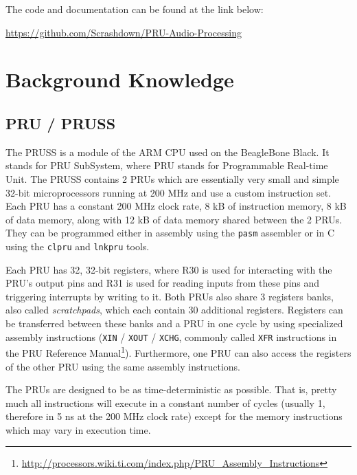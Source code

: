 \documentclass[]{report}
\begin{document}
The code and documentation can be found at the link below:
\begin{center}
	\url{https://github.com/Scrashdown/PRU-Audio-Processing}
\end{center}

	\chapter{Background Knowledge}
	\label{theory}

\hypertarget{pru-pruss}{%
\section{PRU / PRUSS}\label{pru-pruss}}

The PRUSS is a module of the ARM CPU used on the BeagleBone Black. It stands for PRU SubSystem, where PRU stands for Programmable Real-time Unit. The PRUSS contains 2 PRUs which are essentially very small and simple 32-bit microprocessors running at 200 MHz and use a custom instruction set. Each PRU has a constant 200 MHz clock rate, 8 kB of instruction memory, 8 kB of data memory, along with 12 kB of data memory shared between the 2 PRUs. They can be programmed either in assembly using the \texttt{pasm} assembler or in C using the \texttt{clpru} and \texttt{lnkpru} tools.

Each PRU has 32, 32-bit registers, where R30 is used for interacting with the PRU's output pins and R31 is used for reading inputs from these pins and triggering interrupts by writing to it. Both PRUs also share 3 registers banks, also called \emph{scratchpads}, which each contain 30 additional registers. Registers can be transferred between these banks and a PRU in one cycle by using specialized assembly instructions (\texttt{XIN} / \texttt{XOUT} / \texttt{XCHG}, commonly called \texttt{XFR} instructions in the PRU Reference Manual\footnote{\url{http://processors.wiki.ti.com/index.php/PRU_Assembly_Instructions}}). Furthermore, one PRU can also access the registers of the other PRU using the same assembly instructions.

The PRUs are designed to be as time-deterministic as possible. That is, pretty much all instructions will execute in a constant number of cycles (usually 1, therefore in 5 ns at the 200 MHz clock rate) except for the memory instructions which may vary in execution time.
\end{document}
